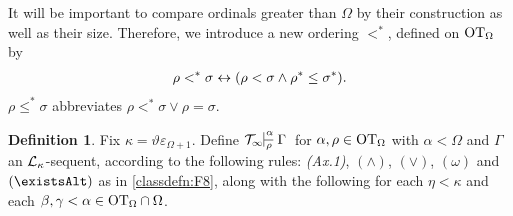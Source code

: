 \documentclass[UKenglish,cleveref,DIV=12]{scrartcl}
\let\exists\existsAlt
\theoremstyle{definition}
\newtheorem{definition}[lemma]{Definition}
\theoremstyle{definition}
\begin{document}
It will be important to compare ordinals greater than $\Omega$ by their construction as well as their size. Therefore, we introduce a new ordering $<^*$, defined on $\mathrm{OT}_\Omega$ by
\begin{align*}
  \rho<^*\sigma\leftrightarrow(\rho<\sigma\land\rho^*\le\sigma^*).
\end{align*}
$\rho\le^*\sigma$ abbreviates $\rho<^*\sigma\lor\rho=\sigma$.
\begin{definition}%
Fix $\kappa=\vartheta\varepsilon_{\Omega+1}$. Define $\Tinfty\prov{\alpha}{\rho}
\Gamma$ for $\alpha, \rho\in\mathrm{OT}_\Omega$ with $\alpha<\Omega$ and $\Gamma$ an $\mathcal{L}_\kappa$-sequent, according to the
following rules: {\em (Ax.1)}, $(\wedge)$, $(\lor)$, $(\omega)$ and $(\exists)$
as in \cref{classdefn:F8}, along with the following for each $\eta<\kappa$ and each
$\beta,\gamma<\alpha\in\mathrm{OT}_\Omega\cap\Omega$.
\end{definition}
\end{document}
